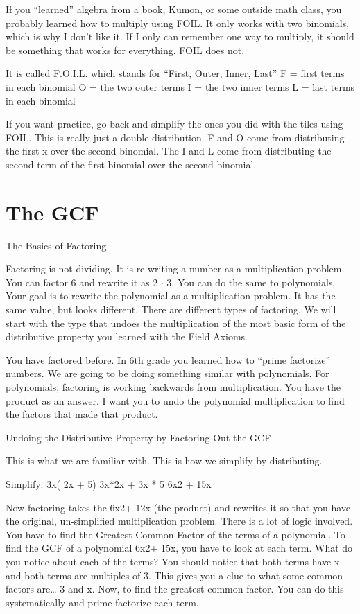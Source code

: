 If you ``learned'' algebra from a book, Kumon, or some outside math class, you probably learned how to multiply using FOIL. It only works with two binomials, which is why I don't like it. If I only can remember one way to multiply, it should be something that works for everything. FOIL does not. 

It is called F.O.I.L. which stands for ``First, Outer, Inner, Last''
F = first terms in each binomial
O = the two outer terms
I = the two inner terms
L = last terms in each binomial

If you want practice, go back and simplify the ones you did with the tiles using FOIL. This is really just a double distribution. F and O come from distributing the first x over the second binomial. The I and L come from distributing the second term of the first binomial over the second binomial. 

\section{The GCF}

The Basics of Factoring

Factoring is not dividing. It is re-writing a number as a multiplication problem. You can factor 6 and rewrite it as 2 $\cdot$ 3. You can do the same to polynomials. Your goal is to rewrite the polynomial as a multiplication problem. It has the same value, but looks different. There are different types of factoring. We will start with the type that undoes the multiplication of the most basic form of the distributive property you learned with the Field Axioms.

You have factored before. In 6th grade you learned how to ``prime factorize'' numbers. We are going to be doing something similar with polynomials. For polynomials, factoring is working backwards from multiplication. You have the product as an answer. I want you to undo the polynomial multiplication to find the factors that made that product.

Undoing the Distributive Property by Factoring Out the GCF

This is what we are familiar with. This is how we simplify by distributing.

 Simplify:
 3x( 2x + 5)
 3x*2x + 3x * 5
 6x2 + 15x

Now factoring takes the 6x2+ 12x (the product) and rewrites it so that you have the original, un-simplified multiplication problem. There is a lot of logic involved. You have to find the Greatest Common Factor of the terms of a polynomial. To find the GCF of a polynomial 6x2+ 15x, you have to look at each term. What do you notice about each of the terms? You should notice that both terms have x and both terms are multiples of 3. This gives you a clue to what some common factors are\ldots{} 3 and x. Now, to find the greatest common factor. You can do this systematically and prime factorize each term.

